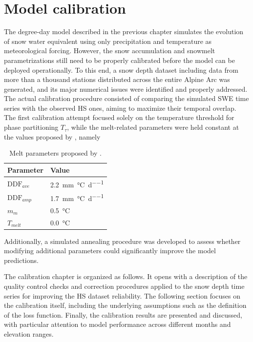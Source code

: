 \chapter{Model calibration}
\label{cap:swe_calibration}

The degree-day model described in the previous chapter simulates the evolution of snow water equivalent using only precipitation and temperature as 
meteorological forcing. However, the snow accumulation and snowmelt parametrizations still need to be properly calibrated before the model can be deployed 
operationally. To this end, a snow depth dataset including data from more than a thousand stations distributed across the entire Alpine Arc was generated, 
and its major numerical issues were identified and properly addressed. The actual calibration procedure consisted of comparing the simulated SWE time 
series with the observed HS ones, aiming to maximize their temporal overlap. The first calibration attempt focused solely on the temperature threshold 
for phase partitioning $T_\tau$, while the melt-related parameters were held constant at the values proposed by \textcite{Magnusson_DDF}, namely 

\begin{table}[H]
  \centering
  \caption{Melt parameters proposed by \textcite{Magnusson_DDF}.}
  \label{tab:magn_param}
  \renewcommand{\arraystretch}{1.3}
  \begin{tabular}{@{} >{\raggedright\arraybackslash}m{3.0cm} >{\raggedright\arraybackslash}m{3.5cm} @{}}
    \toprule
    \textbf{Parameter} & \textbf{Value} \\
    \midrule
    $\text{DDF}_{ave}$ & \SI{2.2}{\milli\meter\per\degreeCelsius\per\day}\\
    $\text{DDF}_{amp}$ & \SI{1.7}{\milli\meter\per\degreeCelsius\per\day}\\
    $m_m$ & \SI{0.5}{\degreeCelsius} \\
    $T_{melt}$ & \SI{0.0}{\degreeCelsius} \\
    \bottomrule
  \end{tabular}
\end{table}

\noindent Additionally, a simulated annealing procedure was developed to assess whether modifying additional parameters could significantly improve the 
model predictions.

The calibration chapter is organized as follows. It opens with a description of the quality control checks and correction procedures applied to the snow 
depth time series for improving the HS dataset reliability. The following section focuses on the calibration itself, including the underlying assumptions 
such as the definition of the loss function. Finally, the calibration results are presented and discussed, with particular attention to model performance 
across different months and elevation ranges.










